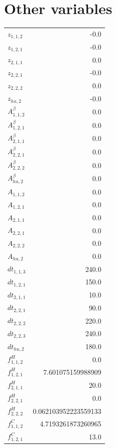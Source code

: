 \documentclass{article}%
\makeatletter
\let\mcnewpage=\newpage%
\newcommand{\TrickSupertabularIntoMulticols}{%
\renewcommand\newpage{%
\if@firstcolumn%
\hrule width\linewidth height0pt%
\columnbreak%
\else%
\mcnewpage%
\fi%
}%
}%
\makeatother
\begin{document}
\section{Other variables}%
\thispagestyle{plain}%
\begin{multicols*}{3}%
\TrickSupertabularIntoMulticols%
%
\begin{supertabular}{lr}%
	$z_{1,1,2}$ & -0.0 \\%
	$z_{1,2,1}$ & -0.0 \\%
	$z_{2,1,1}$ & 0.0 \\%
	$z_{2,2,1}$ & -0.0 \\%
	$z_{2,2,2}$ & 0.0 \\%
	$z_{hu,2}$ & -0.0 \\%
	$A_{1,1,2}^{\beta}$ & 0.0 \\%
	$A_{1,2,1}^{\beta}$ & 0.0 \\%
	$A_{2,1,1}^{\beta}$ & 0.0 \\%
	$A_{2,2,1}^{\beta}$ & 0.0 \\%
	$A_{2,2,2}^{\beta}$ & 0.0 \\%
	$A_{hu,2}^{\beta}$ & 0.0 \\%
	$A_{1,1,2}$ & 0.0 \\%
	$A_{1,2,1}$ & 0.0 \\%
	$A_{2,1,1}$ & 0.0 \\%
	$A_{2,2,1}$ & 0.0 \\%
	$A_{2,2,2}$ & 0.0 \\%
	$A_{hu,2}$ & 0.0 \\%
	$dt_{1,1,3}$ & 240.0 \\%
	$dt_{1,2,1}$ & 150.0 \\%
	$dt_{2,1,1}$ & 10.0 \\%
	$dt_{2,2,1}$ & 90.0 \\%
	$dt_{2,2,2}$ & 220.0 \\%
	$dt_{2,2,3}$ & 240.0 \\%
	$dt_{hu,2}$ & 180.0 \\%
	$f_{1,1,2}^{H}$ & 0.0 \\%
	$f_{1,2,1}^{H}$ & 7.601075159988909 \\%
	$f_{2,1,1}^{H}$ & 20.0 \\%
	$f_{2,2,1}^{H}$ & 0.0 \\%
	$f_{2,2,2}^{H}$ & 0.062103952223559133 \\%
	$f_{1,1,2}^{C}$ & 4.7193261873260965 \\%
	$f_{1,2,1}^{C}$ & 13.0 \\%

\end{supertabular}
\end{multicols*}
\end{document}
